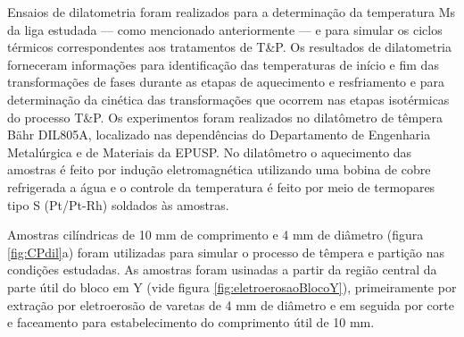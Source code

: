 \label{subsec:dilatometria}

Ensaios de dilatometria foram realizados para a determinação da temperatura Ms da liga estudada --- como mencionado anteriormente --- e para simular os ciclos térmicos correspondentes aos tratamentos de T\&P. Os resultados de dilatometria forneceram informações para identificação das temperaturas de início e fim das transformações de fases durante as etapas de aquecimento e resfriamento e para determinação da cinética das transformações que ocorrem nas etapas isotérmicas do processo T\&P. Os experimentos foram realizados no dilatômetro de têmpera Bähr DIL805A, localizado nas dependências do Departamento de Engenharia Metalúrgica e de Materiais da EPUSP. No dilatômetro o aquecimento das amostras é feito por indução eletromagnética utilizando uma bobina de cobre refrigerada a água e o controle da temperatura é feito por meio de termopares tipo S (Pt/Pt-Rh) soldados às amostras.

Amostras cilíndricas de 10 mm de comprimento e 4 mm de diâmetro (figura \ref{fig:CPdil}a) foram utilizadas para simular o processo de têmpera e partição nas condições estudadas. As amostras foram usinadas a partir da região central da parte útil do bloco em Y (vide figura \ref{fig:eletroerosaoBlocoY}), primeiramente por extração por eletroerosão de varetas de 4 mm de diâmetro e em seguida por corte e faceamento para estabelecimento do comprimento útil de 10 mm.

